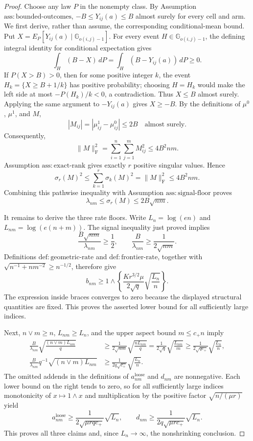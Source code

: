\documentclass{article}
\begin{document}
\begin{proof}
Choose any law \(P\) in the nonempty class.  By Assumption
\(\mathrm{ass:bounded\mbox{-}outcomes}\),
\(-B\le Y_{ij}(a)\le B\) almost surely for every cell and arm.  We first
derive, rather than assume, the corresponding conditional-mean bound.  Put
\(X=E_P[Y_{ij}(a)\mid\mathbb G_{o(i,j)-1}]\).  For every event
\(H\in\mathbb G_{o(i,j)-1}\), the defining integral identity for conditional
expectation gives
\[
 \int_H(B-X)\,dP=\int_H(B-Y_{ij}(a))\,dP\ge0.
\]
If \(P(X>B)>0\), then for some positive integer \(k\), the event
\(H_k=\{X\ge B+1/k\}\) has positive probability; choosing \(H=H_k\)
would make the left side at most \(-P(H_k)/k<0\), a contradiction.  Thus
\(X\le B\) almost surely.  Applying the same argument to \(-Y_{ij}(a)\)
gives \(X\ge-B\).  By the definitions of \(\mu^0\), \(\mu^1\), and \(M\),
\[
 |M_{ij}|=|\mu^1_{ij}-\mu^0_{ij}|\le2B
 \quad\text{almost surely}.
\]
Consequently,
\[
 \lVert M\rVert_{\mathrm F}^2
 =\sum_{i=1}^n\sum_{j=1}^m M_{ij}^2\le4B^2nm.
\]
Assumption \(\mathrm{ass:exact\mbox{-}rank}\) gives exactly \(r\) positive
singular values.  Hence
\[
 \sigma_r(M)^2\le\sum_{k=1}^r\sigma_k(M)^2
 =\lVert M\rVert_{\mathrm F}^2\le4B^2nm.
\]
Combining this pathwise inequality with Assumption
\(\mathrm{ass:signal\mbox{-}floor}\) proves
\[
 \lambda_{nm}\le\sigma_r(M)\le2B\sqrt{nm}.
\]

It remains to derive the three rate floors.  Write \(L_n=\log(en)\) and
\(L_{nm}=\log(e(n+m))\).  The signal inequality just proved implies
\[
 \frac{B\sqrt{nm}}{\lambda_{nm}}\ge\frac12,
 \qquad
 \frac B{\lambda_{nm}}\ge\frac1{2\sqrt{nm}}.
\]
Definitions \(\mathrm{def:geometric\mbox{-}rate}\) and
\(\mathrm{def:frontier\mbox{-}rate}\), together with
\(\sqrt{n^{-1}+nm^{-2}}\ge n^{-1/2}\), therefore give
\[
 b_{nm}\ge 1\wedge
 \left\{\frac{K r^{3/2}\mu}{2\sqrt q}
 \sqrt{\frac{L_n}{n}}\right\}.
\]
The expression inside braces converges to zero because the displayed
structural quantities are fixed.  This proves the asserted lower bound for
all sufficiently large indices.

Next, \(n\vee m\ge n\), \(L_{nm}\ge L_n\), and the upper aspect bound
\(m\le c_+n\) imply
\[
 \begin{aligned}
 \frac B{\lambda_{nm}}
 \sqrt{\frac{(n\vee m)L_{nm}}q}
 &\ge \frac1{2\sqrt{nm}}\sqrt{\frac{nL_{nm}}q}
 =\frac1{2\sqrt q}\sqrt{\frac{L_{nm}}m}
 \ge\frac1{2\sqrt{q c_+}}\sqrt{\frac{L_n}n},\\
 \frac B{\lambda_{nm}}q^{-1}
 \sqrt{(n\vee m)L_{nm}}
 &\ge\frac1{2q\sqrt{c_+}}\sqrt{\frac{L_n}n}.
 \end{aligned}
\]
The omitted addends in the definitions of \(a^{\mathrm{loose}}_{nm}\) and
\(d_{nm}\) are nonnegative.  Each lower bound on the right tends to zero, so
for all sufficiently large indices monotonicity of \(x\mapsto1\wedge x\)
and multiplication by the positive factor \(\sqrt{n/(\mu r)}\) yield
\[
 a^{\mathrm{loose}}_{nm}\ge
 \frac1{2\sqrt{\mu r q c_+}}\sqrt{L_n},
 \qquad
 d_{nm}\ge
 \frac1{2q\sqrt{\mu r c_+}}\sqrt{L_n}.
\]
This proves all three claims and, since \(L_n\to\infty\), the nonshrinking
conclusion.
\end{proof}
\end{document}
